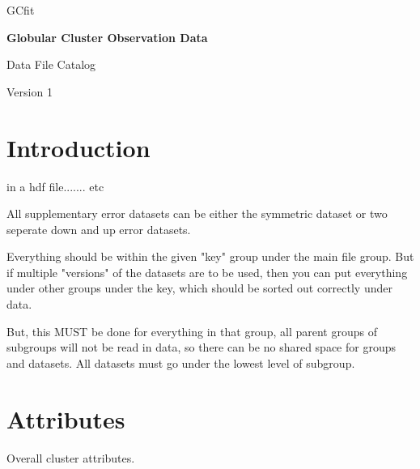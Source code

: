 \documentclass[12pt]{article}
\begin{document}
\begin{titlepage}
       \vspace*{2cm}

       \LARGE
        GCfit

       \vspace{2cm}

       \Huge
       \textbf{Globular Cluster Observation Data}

       \vspace{2cm}
        
        \LARGE
        Data File Catalog

       \vspace{1.5cm}

       \vfill

       Version 1
\end{titlepage}

\section{Introduction}

in a hdf file....... etc

All supplementary error datasets can be either the symmetric dataset or two
seperate down and up error datasets.

Everything should be within the given "key" group under the main file group.
But if multiple "versions" of the datasets are to be used, then you can put
everything under other groups under the key, which should be sorted out
correctly under data.

But, this MUST be done for everything in that group, all parent groups of
subgroups will not be read in data, so there can be no shared space for groups
and datasets. All datasets must go under the lowest level of subgroup.

\section{Attributes}

Overall cluster attributes. 
\end{document}
